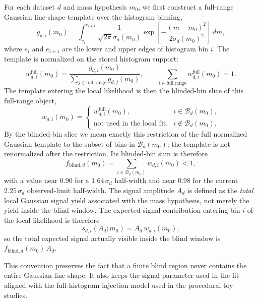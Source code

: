 For each dataset $d$ and mass hypothesis $m_0$, we first construct a
full-range Gaussian line-shape template over the histogram binning,
\begin{equation}
g_{d,i}(m_0) =
\int_{e_i}^{e_{i+1}}
\frac{1}{\sqrt{2\pi}\sigma_d(m_0)}
\exp\!\left[-\frac{(m-m_0)^2}{2\sigma_d(m_0)^2}\right]\,dm,
\end{equation}
where $e_i$ and $e_{i+1}$ are the lower and upper edges of histogram bin $i$.
The template is normalized on the stored histogram support:
\begin{equation}
w^{\mathrm{full}}_{d,i}(m_0)=\frac{g_{d,i}(m_0)}{\sum_{j\in\mathrm{full\ range}}g_{d,j}(m_0)},\qquad
\sum_{i \in \mathrm{full\ range}} w^{\mathrm{full}}_{d,i}(m_0) = 1.
\end{equation}
The template entering the local likelihood is then the blinded-bin slice of this
full-range object,
\begin{equation}
w_{d,i}(m_0) =
\begin{cases}
w^{\mathrm{full}}_{d,i}(m_0), & i \in \mathcal{B}_d(m_0), \\
\text{not used in the local fit}, & i \notin \mathcal{B}_d(m_0).
\end{cases}
\label{eq:window-template}
\end{equation}
By the blinded-bin slice we mean exactly this restriction of the full normalized
Gaussian template to the subset of bins in $\mathcal{B}_d(m_0)$; the template is not
renormalized after the restriction.
Its blinded-bin sum is therefore
\begin{equation}
f_{\mathrm{blind},d}(m_0) = \sum_{i \in \mathcal{B}_d(m_0)} w_{d,i}(m_0) < 1,
\end{equation}
with a value near 0.90 for a $1.64\,\sigma_d$ half-width and near 0.98 for the current
$2.25\,\sigma_d$ observed-limit half-width. The signal
amplitude $A_d$ is defined as the \emph{total} local Gaussian signal yield associated
with the mass hypothesis, not merely the yield inside the blind window. The expected
signal contribution entering bin $i$ of the local likelihood is therefore
\begin{equation}
s_{d,i}(A_d;m_0) = A_d\,w_{d,i}(m_0),
\label{eq:signal-bin-contribution}
\end{equation}
so the total expected signal actually visible inside the blind window is
$f_{\mathrm{blind},d}(m_0)\,A_d$.

This convention preserves the fact that a finite blind region never contains the
entire Gaussian line shape. It
also keeps the signal parameter used in the fit aligned with the full-histogram
injection model used in the procedural toy studies.


